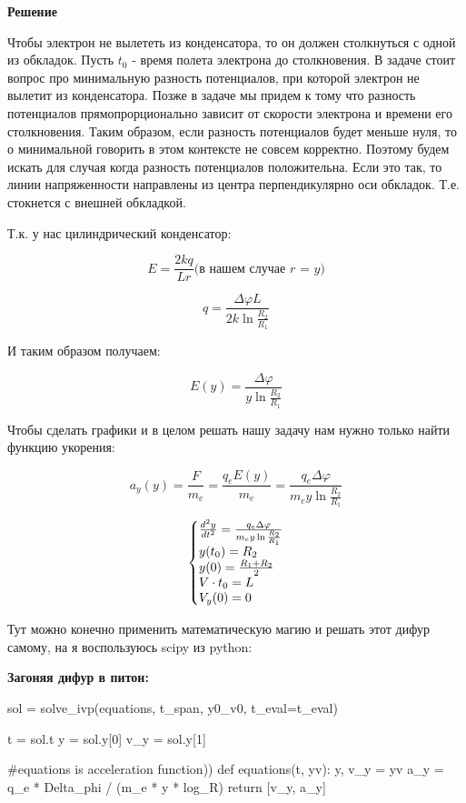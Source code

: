 \documentclass[12pt]{article}
\makeatletter
\newenvironment{system}%
{\left\lbrace\begin{array}{@{}l@{}}}%
{\end{array}\right.}
\makeatother
\begin{document}
\large \textbf{Решение} \normalsize

Чтобы электрон не вылететь из конденсатора, то он должен столкнуться с одной из обкладок. Пусть $t_0$ - время полета электрона до столкновения.
    В задаче стоит вопрос про минимальную разность потенциалов, при которой электрон не вылетит из конденсатора. Позже в задаче мы придем
    к тому что разность потенциалов прямопрорционально зависит от скорости электрона и времени его столкновения. Таким образом, если 
    разность потенциалов будет меньше нуля, то о минимальной говорить в этом контексте не совсем корректно. Поэтому
    будем искать для случая когда разность потенциалов положительна. Если это так, то линии напряженности направлены из центра перпендикулярно оси
    обкладок. Т.е. стокнется с внешней обкладкой. 


    Т.к. у нас цилиндрический конденсатор:

    $$E = \frac{2kq}{Lr} \text{(в нашем случае $r$ = $y$)}$$ 

    $$q = \frac{\Delta \varphi L}{2k \ln \frac{R_2}{R_1}}$$ 

    И таким образом получаем:

    $$E(y) = \frac{\Delta \varphi }{y \ln \frac{R_2}{R_1}}$$

    Чтобы сделать графики и в целом решать нашу задачу нам нужно только найти функцию укорения:

    $$a_y(y) = \frac{F}{m_e} = \frac{q_e E(y)}{m_e} = \frac{q_e \Delta \varphi }{m_e y \ln \frac{R_2}{R_1}}$$

    \begin{equation}
        \begin{system}
        \frac{d^2y}{dt^2} = \frac{q_e \Delta \varphi }{m_e y \ln \frac{R_2}{R_1}} \\
        y(t_0) = R_2 \\
        y(0) = \frac{R_1+R_2}{2} \\
        V \cdot t_0 = L \\
        V_y(0)=0 \\
        \end{system}
    \end{equation}

    Тут можно конечно применить математическую магию и решать этот дифур самому, на я воспользуюсь scipy из python:

    \large \textbf{Загоняя дифур в питон:} \normalsize

    \begin{python}
sol = solve_ivp(equations, t_span, y0_v0, t_eval=t_eval)

t = sol.t
y = sol.y[0]
v_y = sol.y[1]

#equations is acceleration function))
def equations(t, yv):
    y, v_y = yv
    a_y = q_e * Delta_phi / (m_e * y * log_R)
    return [v_y, a_y]
\end{python}
\end{document}
